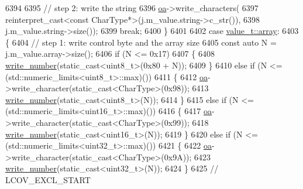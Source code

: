 \begin{DoxyCode}
6394 
6395                 \textcolor{comment}{// step 2: write the string}
6396                 \hyperlink{classnlohmann_1_1detail_1_1binary__writer_a6f15b782a7900f50ef37d123008e601b}{oa}->write\_characters(
6397                     reinterpret\_cast<const CharType*>(j.m\_value.string->c\_str()),
6398                     j.m\_value.string->size());
6399                 \textcolor{keywordflow}{break};
6400             \}
6401 
6402             \textcolor{keywordflow}{case} \hyperlink{namespacenlohmann_1_1detail_a1ed8fc6239da25abcaf681d30ace4985af1f713c9e000f5d3f280adbd124df4f5}{value\_t::array}:
6403             \{
6404                 \textcolor{comment}{// step 1: write control byte and the array size}
6405                 \textcolor{keyword}{const} \textcolor{keyword}{auto} N = j.m\_value.array->size();
6406                 \textcolor{keywordflow}{if} (N <= 0x17)
6407                 \{
6408                     \hyperlink{classnlohmann_1_1detail_1_1binary__writer_a62cfd50a511371e718f37ad7bb29ae9d}{write\_number}(static\_cast<uint8\_t>(0x80 + N));
6409                 \}
6410                 \textcolor{keywordflow}{else} \textcolor{keywordflow}{if} (N <= (std::numeric\_limits<uint8\_t>::max)())
6411                 \{
6412                     \hyperlink{classnlohmann_1_1detail_1_1binary__writer_a6f15b782a7900f50ef37d123008e601b}{oa}->write\_character(static\_cast<CharType>(0x98));
6413                     \hyperlink{classnlohmann_1_1detail_1_1binary__writer_a62cfd50a511371e718f37ad7bb29ae9d}{write\_number}(static\_cast<uint8\_t>(N));
6414                 \}
6415                 \textcolor{keywordflow}{else} \textcolor{keywordflow}{if} (N <= (std::numeric\_limits<uint16\_t>::max)())
6416                 \{
6417                     \hyperlink{classnlohmann_1_1detail_1_1binary__writer_a6f15b782a7900f50ef37d123008e601b}{oa}->write\_character(static\_cast<CharType>(0x99));
6418                     \hyperlink{classnlohmann_1_1detail_1_1binary__writer_a62cfd50a511371e718f37ad7bb29ae9d}{write\_number}(static\_cast<uint16\_t>(N));
6419                 \}
6420                 \textcolor{keywordflow}{else} \textcolor{keywordflow}{if} (N <= (std::numeric\_limits<uint32\_t>::max)())
6421                 \{
6422                     \hyperlink{classnlohmann_1_1detail_1_1binary__writer_a6f15b782a7900f50ef37d123008e601b}{oa}->write\_character(static\_cast<CharType>(0x9A));
6423                     \hyperlink{classnlohmann_1_1detail_1_1binary__writer_a62cfd50a511371e718f37ad7bb29ae9d}{write\_number}(static\_cast<uint32\_t>(N));
6424                 \}
6425                 \textcolor{comment}{// LCOV\_EXCL\_START}

\end{DoxyCode}
